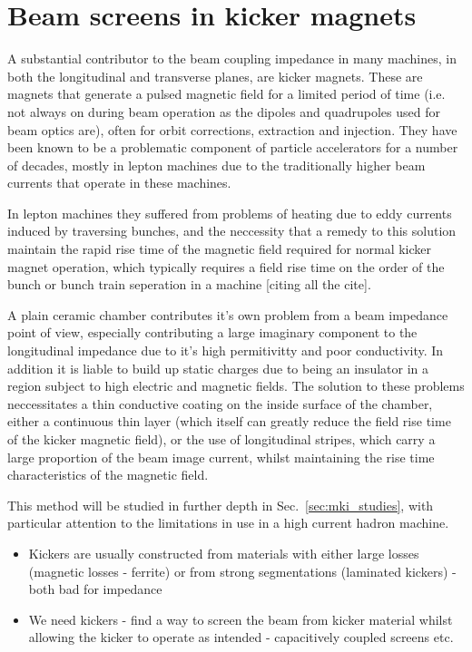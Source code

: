 \section{Beam screens in kicker magnets}
\label{sec:beam_screens}

A substantial contributor to the beam coupling impedance in many machines, in both the longitudinal and transverse planes, are kicker magnets. These are magnets that generate a pulsed magnetic field for a limited period of time (i.e. not always on during beam operation as the dipoles and quadrupoles used for beam optics are), often for orbit corrections, extraction and injection. They have been known to be a problematic component of particle accelerators for a number of decades, mostly in lepton machines due to the traditionally higher beam currents that operate in these machines.

In lepton machines they suffered from problems of heating due to eddy currents induced by traversing bunches, and the neccessity that a remedy to this solution maintain the rapid rise time of the magnetic field required for normal kicker magnet operation, which typically requires a field rise time on the order of the bunch or bunch train seperation in a machine [citing all the cite]. 

A plain ceramic chamber contributes it's own problem from a beam impedance point of view, especially contributing a large imaginary component to the longitudinal impedance due to it's high permitivitty and poor conductivity. In addition it is liable to build up static charges due to being an insulator in a region subject to high electric and magnetic fields. The solution to these problems neccessitates a thin conductive coating on the inside surface of the chamber, either a continuous thin layer (which itself can greatly reduce the field rise time of the kicker magnetic field), or the use of longitudinal stripes, which carry a large proportion of the beam image current, whilst maintaining the rise time characteristics of the magnetic field.

This method will be studied in further depth in Sec.~\ref{sec:mki_studies}, with particular attention to the limitations in use in a high current hadron machine.

\begin{itemize}
\item{Kickers are usually constructed from materials with either large losses (magnetic losses - ferrite) or from strong segmentations (laminated kickers) - both bad for impedance}
\item{We need kickers - find a way to screen the beam from kicker material whilst allowing the kicker to operate as intended - capacitively coupled screens etc.}
\end{itemize}
